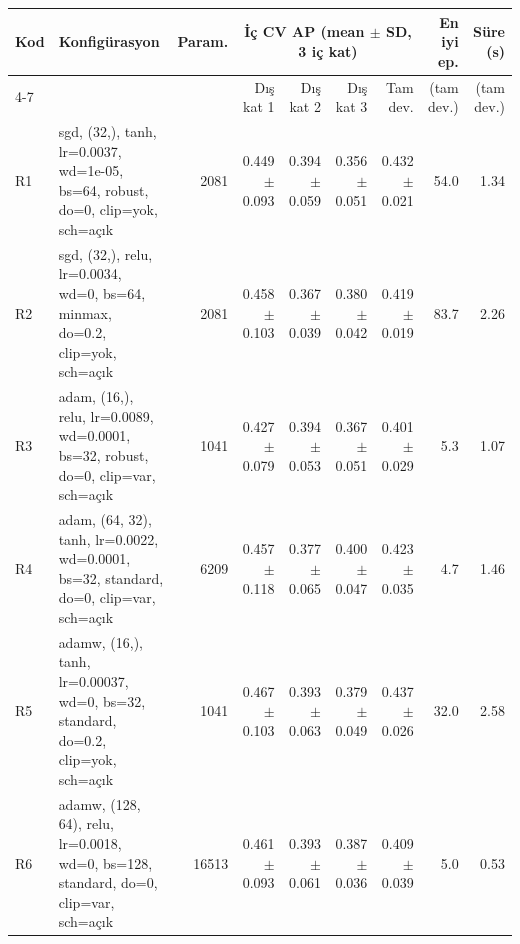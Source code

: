 \begin{tabular}{l l r r r r r r r}\toprule
Kod & Konfigürasyon & Param. & \multicolumn{4}{c}{İç CV AP (mean $\pm$ SD, 3 iç kat)} & En iyi ep. & Süre (s) \\
\cmidrule(lr){4-7} & & & Dış kat 1 & Dış kat 2 & Dış kat 3 & Tam dev. & (tam dev.) & (tam dev.) \\\midrule
R1 & {\scriptsize sgd, (32,), tanh, lr=0.0037, wd=1e-05, bs=64, robust, do=0, clip=yok, sch=açık} & 2081 & 0.449 $\pm$ 0.093 & 0.394 $\pm$ 0.059 & 0.356 $\pm$ 0.051 & 0.432 $\pm$ 0.021 & 54.0 & 1.34 \\
R2 & {\scriptsize sgd, (32,), relu, lr=0.0034, wd=0, bs=64, minmax, do=0.2, clip=yok, sch=açık} & 2081 & 0.458 $\pm$ 0.103 & 0.367 $\pm$ 0.039 & 0.380 $\pm$ 0.042 & 0.419 $\pm$ 0.019 & 83.7 & 2.26 \\
R3 & {\scriptsize adam, (16,), relu, lr=0.0089, wd=0.0001, bs=32, robust, do=0, clip=var, sch=açık} & 1041 & 0.427 $\pm$ 0.079 & 0.394 $\pm$ 0.053 & 0.367 $\pm$ 0.051 & 0.401 $\pm$ 0.029 & 5.3 & 1.07 \\
R4 & {\scriptsize adam, (64, 32), tanh, lr=0.0022, wd=0.0001, bs=32, standard, do=0, clip=var, sch=açık} & 6209 & 0.457 $\pm$ 0.118 & 0.377 $\pm$ 0.065 & 0.400 $\pm$ 0.047 & 0.423 $\pm$ 0.035 & 4.7 & 1.46 \\
R5 & {\scriptsize adamw, (16,), tanh, lr=0.00037, wd=0, bs=32, standard, do=0.2, clip=yok, sch=açık} & 1041 & 0.467 $\pm$ 0.103 & 0.393 $\pm$ 0.063 & 0.379 $\pm$ 0.049 & 0.437 $\pm$ 0.026 & 32.0 & 2.58 \\
R6 & {\scriptsize adamw, (128, 64), relu, lr=0.0018, wd=0, bs=128, standard, do=0, clip=var, sch=açık} & 16513 & 0.461 $\pm$ 0.093 & 0.393 $\pm$ 0.061 & 0.387 $\pm$ 0.036 & 0.409 $\pm$ 0.039 & 5.0 & 0.53 \\
\bottomrule\end{tabular}
